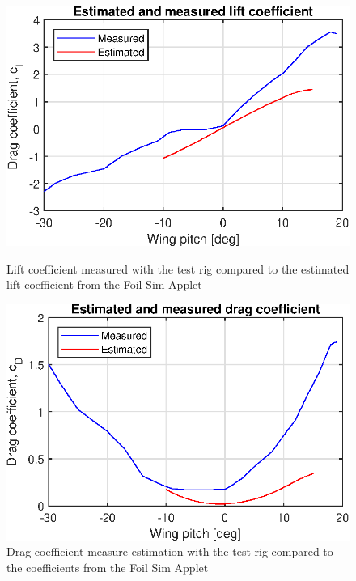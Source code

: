 \begin{figure}[h!]
    \centering
    \begin{minipage}[t]{0.48\textwidth}
        \centering
        \includegraphics[width=1\textwidth]{figures/results/lift_measured.eps}
    \caption{Lift coefficient measured with the test rig compared to the estimated lift coefficient from the Foil Sim Applet}
    \label{fig:lift_measured}
        
    \end{minipage}%
    \hspace{.03\textwidth}
    \begin{minipage}[t]{0.48\textwidth}
        \centering
        \includegraphics[width=1\textwidth]{figures/results/drag_measured.eps}
    \caption{Drag coefficient measure estimation with the test rig compared to the coefficients from the Foil Sim Applet}
    \label{fig:drag_measured}
    \end{minipage}
\end{figure} 
